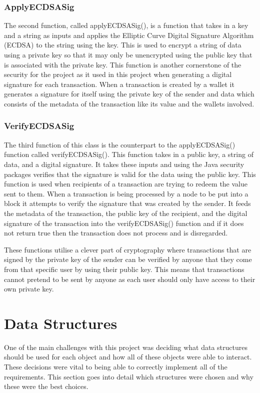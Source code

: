 \documentclass{l4proj}
\begin{document}
\subsubsection{ApplyECDSASig}
The second function, called applyECDSASig(), is a function that takes in a key and a string as inputs and
applies the Elliptic Curve Digital Signature Algorithm (ECDSA) to the string using the key. This is used to encrypt a string
of data using a private key so that it may only be unencrypted using the public key that is associated with the private
key. This function is another cornerstone of the security for the project as it used in this project when generating
a digital signature for each transaction. When a transaction is created by a wallet it generates a signature for
itself using the private key of the sender and data which consists of the metadata of the transaction like its value
and the wallets involved. 

\subsubsection{VerifyECDSASig}
The third function of this class is the counterpart to the applyECDSASig() function called verifyECDSASig(). This 
function takes in a public key, a string of data, and a digital signature. It takes these inputs and using the Java
security packages verifies that the signature is valid for the data using the public key. This function is used
when recipients of a transaction are trying to redeem the value sent to them. When a transaction is being processed
by a node to be put into a block it attempts to verify the signature that was created by the sender. It feeds the metadata
of the transaction, the public key of the recipient, and the digital signature of the transaction into the verifyECDSASig()
function and if it does not return true then the transaction does not process and is disregarded.

These functions utilise a clever part of cryptography where transactions that are signed by the private key of the
sender can be verified by anyone that they come from that specific user by using their public key. This means that 
transactions cannot pretend to be sent by anyone as each user should only have access to their own private key.

\section{Data Structures}
One of the main challenges with this project was deciding what data structures should be used for each object and
how all of these objects were able to interact. These decisions were vital to being able to correctly implement
all of the requirements. This section goes into detail which structures were chosen and why these were the best
choices.
\end{document}
